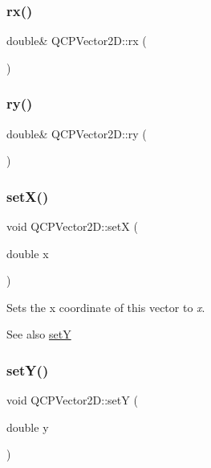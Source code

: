 \subsubsection{\texorpdfstring{rx()}{rx()}}
{\footnotesize\ttfamily double\& Q\+C\+P\+Vector2\+D\+::rx (\begin{DoxyParamCaption}{ }\end{DoxyParamCaption})\hspace{0.3cm}{\ttfamily [inline]}}

\mbox{\label{class_q_c_p_vector2_d_aa8f59a5b54aec8be8e4d1f39db892fea}} 
\subsubsection{\texorpdfstring{ry()}{ry()}}
{\footnotesize\ttfamily double\& Q\+C\+P\+Vector2\+D\+::ry (\begin{DoxyParamCaption}{ }\end{DoxyParamCaption})\hspace{0.3cm}{\ttfamily [inline]}}

\mbox{\label{class_q_c_p_vector2_d_ab4249e6ce7bfc37be56f014c54b761ae}} 
\subsubsection{\texorpdfstring{setX()}{setX()}}
{\footnotesize\ttfamily void Q\+C\+P\+Vector2\+D\+::setX (\begin{DoxyParamCaption}\item[{double}]{x }\end{DoxyParamCaption})\hspace{0.3cm}{\ttfamily [inline]}}

Sets the x coordinate of this vector to {\itshape x}.

\begin{DoxySeeAlso}{See also}
\mbox{\hyperlink{class_q_c_p_vector2_d_ada288019aa8cd51e3b30acfc07b461dc}{setY}} 
\end{DoxySeeAlso}
\mbox{\label{class_q_c_p_vector2_d_ada288019aa8cd51e3b30acfc07b461dc}} 
\subsubsection{\texorpdfstring{setY()}{setY()}}
{\footnotesize\ttfamily void Q\+C\+P\+Vector2\+D\+::setY (\begin{DoxyParamCaption}\item[{double}]{y }\end{DoxyParamCaption})\hspace{0.3cm}{\ttfamily [inline]}}

